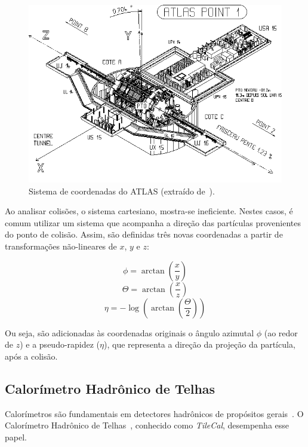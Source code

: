 \begin{figure}[htpb!]
    \centering
    \includegraphics[width=\textwidth]{images/atlas_coordinate_system.png}
    \caption[Sistema de coordenadas do ATLAS]{Sistema de coordenadas do ATLAS (extraído
    de~\cite{EGEDE1998}).}
    \label{fig:coordinates}
\end{figure}

Ao analisar colisões, o sistema cartesiano, mostra-se ineficiente. Nestes
casos, é comum utilizar um sistema que acompanha a direção das partículas
provenientes do ponto de colisão. Assim, são definidas três novas coordenadas
a partir de transformações não-lineares de $x$, $y$ e $z$:

\begin{equation}
    \phi = \arctan\left(\frac{x}{y}\right)
\end{equation}
\begin{equation}
    \Theta = \arctan\left(\frac{x}{z}\right)
\end{equation}
\begin{equation}
    \eta = -\log \left(\arctan\left(\frac{\Theta}{2}\right)\right)
\end{equation}

Ou seja, são adicionadas às coordenadas originais o ângulo azimutal $\phi$ (ao
redor de $z$) e a pseudo-rapidez ($\eta$), que representa a direção da projeção
da partícula, após a colisão.

\subsection{Calorímetro Hadrônico de Telhas}

Calorímetros são fundamentais em detectores hadrônicos de propósitos
gerais~\cite{WIGMANS2000}.  O Calorímetro Hadrônico de
Telhas~\cite{ARIZTIZABAL1994}, conhecido como \emph{TileCal}, desempenha esse
papel.


